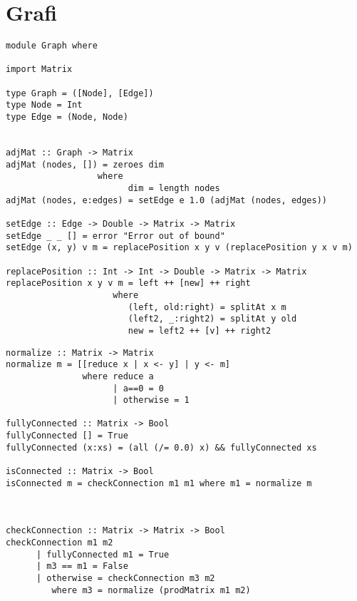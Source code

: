 \section{Grafi}
\begin{verbatim}
module Graph where

import Matrix

type Graph = ([Node], [Edge])
type Node = Int
type Edge = (Node, Node)


adjMat :: Graph -> Matrix
adjMat (nodes, []) = zeroes dim
                  where
                        dim = length nodes
adjMat (nodes, e:edges) = setEdge e 1.0 (adjMat (nodes, edges))

setEdge :: Edge -> Double -> Matrix -> Matrix
setEdge _ _ [] = error "Error out of bound"
setEdge (x, y) v m = replacePosition x y v (replacePosition y x v m)

replacePosition :: Int -> Int -> Double -> Matrix -> Matrix                     
replacePosition x y v m = left ++ [new] ++ right
                     where
                        (left, old:right) = splitAt x m
                        (left2, _:right2) = splitAt y old
                        new = left2 ++ [v] ++ right2
\end{verbatim}
\newpage
\begin{verbatim}	
normalize :: Matrix -> Matrix            
normalize m = [[reduce x | x <- y] | y <- m]
               where reduce a 
                     | a==0 = 0
                     | otherwise = 1
                     
fullyConnected :: Matrix -> Bool
fullyConnected [] = True
fullyConnected (x:xs) = (all (/= 0.0) x) && fullyConnected xs

isConnected :: Matrix -> Bool
isConnected m = checkConnection m1 m1 where m1 = normalize m



checkConnection :: Matrix -> Matrix -> Bool
checkConnection m1 m2
      | fullyConnected m1 = True
      | m3 == m1 = False
      | otherwise = checkConnection m3 m2
         where m3 = normalize (prodMatrix m1 m2)
\end{verbatim}